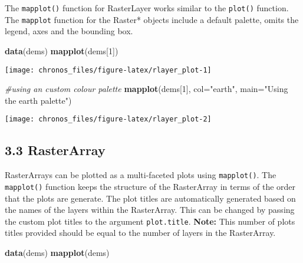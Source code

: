\documentclass[]{article}
\newenvironment{Shaded}{\begin{snugshade}}{\end{snugshade}}
\newcommand{\KeywordTok}[1]{\textcolor[rgb]{0.13,0.29,0.53}{\textbf{#1}}}
\newcommand{\DataTypeTok}[1]{\textcolor[rgb]{0.13,0.29,0.53}{#1}}
\newcommand{\DecValTok}[1]{\textcolor[rgb]{0.00,0.00,0.81}{#1}}
\newcommand{\StringTok}[1]{\textcolor[rgb]{0.31,0.60,0.02}{#1}}
\newcommand{\CommentTok}[1]{\textcolor[rgb]{0.56,0.35,0.01}{\textit{#1}}}
\newcommand{\NormalTok}[1]{#1}
\begin{document}
The \texttt{mapplot()} function for RasterLayer works similar to the
\texttt{plot()} function. The \texttt{mapplot} function for the Raster*
objects include a default palette, omits the legend, axes and the
bounding box.

\begin{Shaded}
\begin{Highlighting}[]
\KeywordTok{data}\NormalTok{(dems)}
\KeywordTok{mapplot}\NormalTok{(dems[}\DecValTok{1}\NormalTok{])}
\end{Highlighting}
\end{Shaded}

\begin{center}\texttt{[image: chronos\_files/figure-latex/rlayer\_plot-1]} \end{center}

\begin{Shaded}
\begin{Highlighting}[]
\CommentTok{#using an custom colour palette}
\KeywordTok{mapplot}\NormalTok{(dems[}\DecValTok{1}\NormalTok{], }\DataTypeTok{col=}\StringTok{"earth"}\NormalTok{, }\DataTypeTok{main=}\StringTok{"Using the earth palette"}\NormalTok{)}
\end{Highlighting}
\end{Shaded}

\begin{center}\texttt{[image: chronos\_files/figure-latex/rlayer\_plot-2]} \end{center}

\subsection{3.3 RasterArray}\label{rasterarray-1}

RasterArrays can be plotted as a multi-faceted plots using
\texttt{mapplot()}. The \texttt{mapplot()} function keeps the structure
of the RasterArray in terms of the order that the plots are generate.
The plot titles are automatically generated based on the names of the
layers within the RasterArray. This can be changed by passing the custom
plot titles to the argument \texttt{plot.title}. \textbf{Note:} This
number of plots titles provided should be equal to the number of layers
in the RasterArray.

\begin{Shaded}
\begin{Highlighting}[]
\KeywordTok{data}\NormalTok{(dems)}
\KeywordTok{mapplot}\NormalTok{(dems)}
\end{Highlighting}
\end{Shaded}
\end{document}
